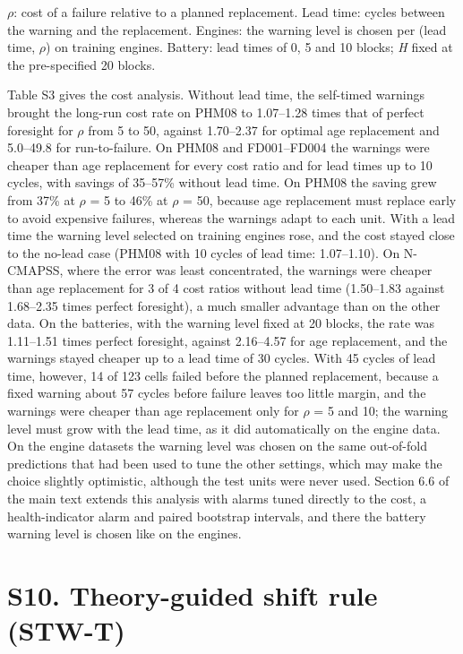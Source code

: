 \documentclass[11pt,a4paper]{article}
\begin{document}
{\scriptsize $\rho$: cost of a failure relative to a planned replacement. Lead time: cycles between the warning and the replacement. Engines: the warning level is chosen per (lead time, $\rho$) on training engines. Battery: lead times of 0, 5 and 10 blocks; \textit{H} fixed at the pre-specified 20 blocks.\par}\medskip

\noindent Table S3 gives the cost analysis. Without lead time, the self-timed warnings brought the long-run cost rate on PHM08 to 1.07--1.28 times that of perfect foresight for $\rho$ from 5 to 50, against 1.70--2.37 for optimal age replacement and 5.0--49.8 for run-to-failure. On PHM08 and FD001--FD004 the warnings were cheaper than age replacement for every cost ratio and for lead times up to 10 cycles, with savings of 35--57\% without lead time. On PHM08 the saving grew from 37\% at $\rho$ = 5 to 46\% at $\rho$ = 50, because age replacement must replace early to avoid expensive failures, whereas the warnings adapt to each unit. With a lead time the warning level selected on training engines rose, and the cost stayed close to the no-lead case (PHM08 with 10 cycles of lead time: 1.07--1.10). On N-CMAPSS, where the error was least concentrated, the warnings were cheaper than age replacement for 3 of 4 cost ratios without lead time (1.50--1.83 against 1.68--2.35 times perfect foresight), a much smaller advantage than on the other data. On the batteries, with the warning level fixed at 20 blocks, the rate was 1.11--1.51 times perfect foresight, against 2.16--4.57 for age replacement, and the warnings stayed cheaper up to a lead time of 30 cycles. With 45 cycles of lead time, however, 14 of 123 cells failed before the planned replacement, because a fixed warning about 57 cycles before failure leaves too little margin, and the warnings were cheaper than age replacement only for $\rho$ = 5 and 10; the warning level must grow with the lead time, as it did automatically on the engine data. On the engine datasets the warning level was chosen on the same out-of-fold predictions that had been used to tune the other settings, which may make the choice slightly optimistic, although the test units were never used. Section 6.6 of the main text extends this analysis with alarms tuned directly to the cost, a health-indicator alarm and paired bootstrap intervals, and there the battery warning level is chosen like on the engines.

\section*{S10. Theory-guided shift rule (STW-T)}
\end{document}

